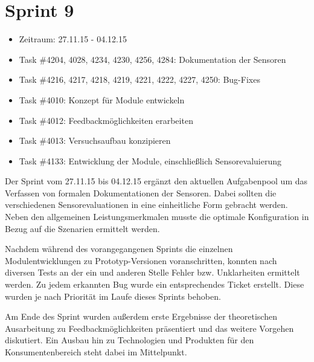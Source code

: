 \documentclass[12pt, oneside, smallheadings]{scrbook}
\begin{document}
\section{Sprint 9}
\begin{itemize}
	\item Zeitraum: 27.11.15 - 04.12.15 \newline
	\item Task \#4204, 4028, 4234, 4230, 4256, 4284: Dokumentation der Sensoren
	\item Task \#4216, 4217, 4218, 4219, 4221, 4222, 4227, 4250: Bug-Fixes
	\item Task \#4010: Konzept für Module entwickeln
	\item Task \#4012: Feedbackmöglichkeiten erarbeiten
	\item Task \#4013: Versuchsaufbau konzipieren
	\item Task \#4133: Entwicklung der Module, einschließlich Sensorevaluierung\\
\end{itemize}
\noindent
Der Sprint vom 27.11.15 bis 04.12.15 ergänzt den aktuellen Aufgabenpool um das Verfassen von formalen  Dokumentationen der Sensoren. Dabei sollten die verschiedenen Sensorevaluationen in eine einheitliche Form gebracht werden. Neben den allgemeinen Leistungsmerkmalen musste die optimale Konfiguration in Bezug auf die Szenarien ermittelt werden.

Nachdem während des vorangegangenen Sprints die einzelnen Modulentwicklungen zu Prototyp-Versionen voranschritten, konnten nach diversen Tests an der ein und anderen Stelle Fehler bzw. Unklarheiten ermittelt werden. Zu jedem erkannten Bug wurde ein entsprechendes Ticket erstellt. Diese wurden je nach Priorität im Laufe dieses Sprints behoben.

Am Ende des Sprint wurden außerdem erste Ergebnisse der theoretischen Ausarbeitung zu Feedbackmöglichkeiten präsentiert und das weitere Vorgehen diskutiert. Ein Ausbau hin zu Technologien und Produkten für den Konsumentenbereich steht dabei im Mittelpunkt.
\end{document}
